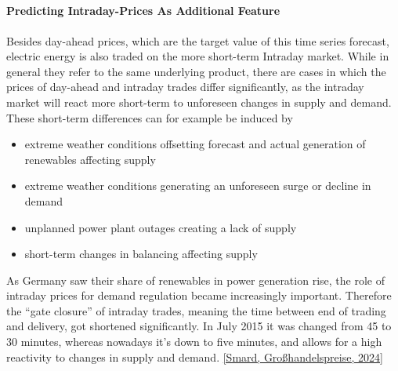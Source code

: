 \documentclass[a4paper]{article}
\providecommand{\tightlist}{%
      \setlength{\itemsep}{0pt}\setlength{\parskip}{0pt}}
\begin{document}
    \begin{center}
    \end{center}
    { \hspace*{\fill} \\}
    
    \begin{center}
    \end{center}
    { \hspace*{\fill} \\}
    
    \begin{center}
    \end{center}
    { \hspace*{\fill} \\}
    
    \paragraph{Predicting Intraday-Prices As Additional
Feature}\label{predicting-intraday-prices-as-additional-feature}

Besides day-ahead prices, which are the target value of this time series
forecast, electric energy is also traded on the more short-term Intraday
market. While in general they refer to the same underlying product,
there are cases in which the prices of day-ahead and intraday trades
differ significantly, as the intraday market will react more short-term
to unforeseen changes in supply and demand. These short-term differences
can for example be induced by

    \begin{itemize}
\tightlist
\item
  extreme weather conditions offsetting forecast and actual generation
  of renewables affecting supply
\item
  extreme weather conditions generating an unforeseen surge or decline
  in demand
\item
  unplanned power plant outages creating a lack of supply
\item
  short-term changes in balancing affecting supply
\end{itemize}

As Germany saw their share of renewables in power generation rise, the
role of intraday prices for demand regulation became increasingly
important. Therefore the ``gate closure'' of intraday trades, meaning
the time between end of trading and delivery, got shortened
significantly. In July 2015 it was changed from 45 to 30 minutes,
whereas nowadays it's down to five minutes, and allows for a high
reactivity to changes in supply and demand. \hyperref[bibliography]{[Smard, Großhandelspreise, 2024]}
\end{document}
